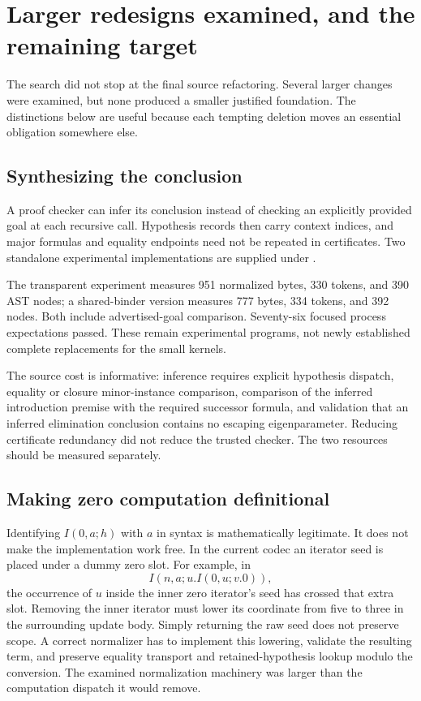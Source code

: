 \section{Larger redesigns examined, and the remaining target}

The search did not stop at the final source refactoring. Several larger
changes were examined, but none produced a smaller justified foundation.
The distinctions below are useful because each tempting deletion moves
an essential obligation somewhere else.

\subsection{Synthesizing the conclusion}

A proof checker can infer its conclusion instead of checking an explicitly
provided goal at each recursive call. Hypothesis records then carry
context indices, and major formulas and equality endpoints need not be
repeated in certificates. Two standalone experimental implementations
are supplied under .

The transparent experiment measures 951 normalized bytes, 330 tokens,
and 390 AST nodes; a shared-binder version measures 777 bytes, 334 tokens,
and 392 nodes. Both include advertised-goal comparison. Seventy-six
focused process expectations passed. These remain experimental programs,
not newly established complete replacements for the small kernels.

The source cost is informative: inference requires explicit hypothesis
dispatch, equality or closure minor-instance comparison, comparison of
the inferred introduction premise with the required successor formula,
and validation that an inferred elimination conclusion contains no
escaping eigenparameter. Reducing certificate redundancy did not reduce
the trusted checker. The two resources should be measured separately.

\subsection{Making zero computation definitional}

Identifying $I(0,a;h)$ with $a$ in syntax is mathematically legitimate.
It does not make the implementation work free. In the current codec an
iterator seed is placed under a dummy zero slot. For example, in
\[
 I(n,a;u.I(0,u;v.0)),
\]
the occurrence of $u$ inside the inner zero iterator's seed has crossed
that extra slot. Removing the inner iterator must lower its coordinate
from five to three in the surrounding update body. Simply returning the
raw seed does not preserve scope. A correct normalizer has to implement
this lowering, validate the resulting term, and preserve equality
transport and retained-hypothesis lookup modulo the conversion.
The examined normalization machinery was larger than the computation
dispatch it would remove.

